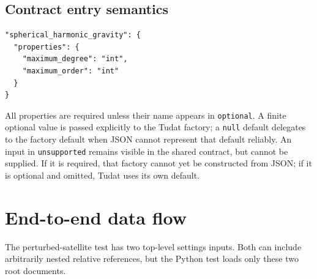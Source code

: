 \documentclass[10pt,a4paper]{article}
\newcommand{\code}[1]{\texttt{#1}}
\begin{document}
\subsection{Contract entry semantics}

\begin{lstlisting}[style=jsonstyle]
"spherical_harmonic_gravity": {
  "properties": {
    "maximum_degree": "int",
    "maximum_order": "int"
  }
}
\end{lstlisting}

All properties are required unless their name appears in \code{optional}. A
finite optional value is passed explicitly to the Tudat factory; a
\code{null} default delegates to the factory default when JSON cannot represent
that default reliably. An input in \code{unsupported} remains visible in the
shared contract, but cannot be supplied. If it is required, that factory cannot
yet be constructed from JSON; if it is optional and omitted, Tudat uses its own
default.

\section{End-to-end data flow}

The perturbed-satellite test has two top-level settings inputs. Both can include
arbitrarily nested relative references, but the Python test loads only these two
root documents.
\end{document}
